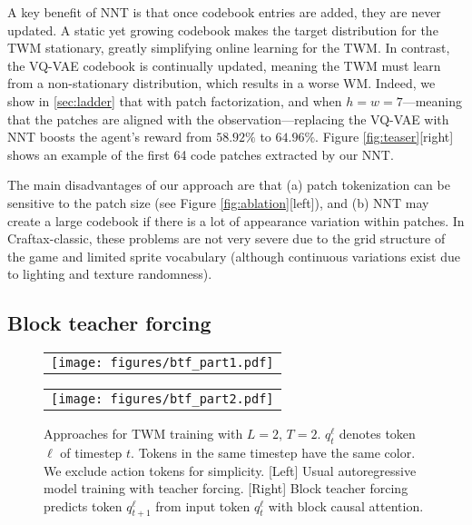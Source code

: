 A key benefit of NNT is that once codebook entries are added, they are never updated.
A static yet growing codebook makes the target distribution for the TWM stationary, greatly simplifying online learning for the TWM.
In contrast, the VQ-VAE codebook is continually updated, meaning the TWM must learn from a non-stationary distribution, which results in a worse WM.
Indeed, we show in \cref{sec:ladder} that with patch factorization, and when $h=w=7$---meaning that the patches are aligned with the observation---replacing the VQ-VAE with NNT boosts the agent's reward from $58.92\%$ to $64.96\%$. 
Figure \ref{fig:teaser}[right] shows an example of the first 64 code patches extracted by our NNT.

The main disadvantages of our approach are that (a) patch tokenization can be sensitive to the patch size (see Figure \ref{fig:ablation}[left]),
and (b) NNT may create a large codebook if there is a lot
of appearance variation within patches.
In Craftax-classic, these problems are not very severe due to the grid structure of the game and limited sprite vocabulary (although continuous variations exist due to lighting and texture randomness).





\subsection{Block teacher forcing}
\label{sec:btf}


\begin{figure}[h!]
    \centering
    \begin{tabular}{c}
        \texttt{[image: figures/btf\_part1.pdf]} 
    \end{tabular}
    \begin{tabular}{c}
        \texttt{[image: figures/btf\_part2.pdf]}
    \end{tabular}
    \caption{
    Approaches for TWM training with $L=2$, $T=2$.
    $q_t^{\ell}$ denotes token $\ell$ of timestep $t$. Tokens in the same timestep have the same color. 
    We exclude action tokens for simplicity.
    [Left] Usual autoregressive model training with teacher forcing. 
    [Right] Block teacher forcing predicts token $q_{t+1}^{\ell}$ from input token $q_{t}^{\ell}$ with block causal attention.
    }
    \label{fig:btf}
\end{figure}

